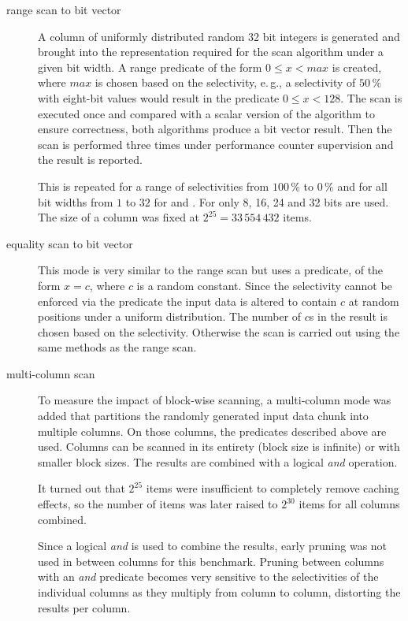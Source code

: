 \begin{description}
\item[range scan to bit vector]
  A column of uniformly distributed random 32 bit integers is generated and
  brought into the representation required for the scan algorithm under a
  given bit width. A range predicate of the form $0 \le x < max$ is created,
  where $max$ is chosen based on the selectivity, e.\,g., a selectivity of
  $50\,\%$ with eight-bit values would result in the predicate $0 \le x < 128$.
  The scan is executed once and compared with a scalar version of the algorithm
  to ensure correctness, both algorithms produce a bit vector result. Then the
  scan is performed three times under performance counter supervision and the
  result is reported.

  This is repeated for a range of selectivities from $100\,\%$ to $0\,\%$ and
  for all bit widths from $1$ to $32$ for \simdscan{} and \bwv{}. For \bs{} only
  8, 16, 24 and 32 bits are used. The size of a column was fixed at
  $2^{25}=33\,554\,432$ items.

\item[equality scan to bit vector]
  This mode is very similar to the range scan but uses a predicate, of the form
  $x = c$, where $c$ is a random constant. Since the selectivity cannot be
  enforced via the predicate the input data is altered to contain $c$ at random
  positions under a uniform distribution. The number of $c$s in the result is
  chosen based on the selectivity. Otherwise the scan is carried out using the
  same methods as the range scan.

\item[multi-column scan]
  To measure the impact of block-wise scanning, a multi-column mode was added
  that partitions the randomly generated input data chunk into multiple
  columns. On those columns, the predicates described above are used. Columns
  can be scanned in its entirety (block size is infinite) or with smaller
  block sizes. The results are combined with a logical \emph{and} operation.

  It turned out that $2^{25}$ items were insufficient to completely remove
  caching effects, so the number of items was later raised to $2^{30}$ items for
  all columns combined.

  Since a logical \emph{and} is used to combine the results, early pruning was
  not used in between columns for this benchmark. Pruning between columns with
  an \emph{and} predicate becomes very sensitive to the selectivities of the
  individual columns as they multiply from column to column, distorting the
  results per column.


\end{description}
